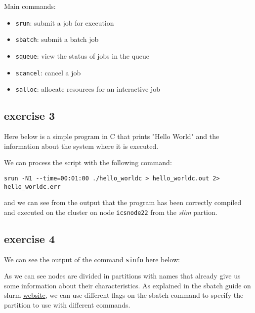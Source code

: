 Main commands:
\begin{itemize}
    \item \texttt{srun}: submit a job for execution
    \item \texttt{sbatch}: submit a batch job
    \item \texttt{squeue}: view the status of jobs in the queue
    \item \texttt{scancel}: cancel a job
    \item \texttt{salloc}: allocate resources for an interactive job
\end{itemize}

\subsection{exercise 3}
Here below is a simple program in C that prints "Hello World" and the information about the system where it is executed.


We can process the script with the following command:    
\begin{verbatim}
srun -N1 --time=00:01:00 ./hello_worldc > hello_worldc.out 2> hello_worldc.err
\end{verbatim}
and we can see from the output that the program has been correctly compiled and executed on the cluster on node \texttt{icsnode22} from the \textit{slim} partion.



\subsection{exercise 4}
We can see the output of the command \texttt{sinfo} here below: 



As we can see nodes are divided in partitions with names that already give us some information about their characteristics.
As explained in the sbatch guide on slurm \href{https://slurm.schedmd.com/sbatch.html}{website}, we can use different flags on the sbatch command to specify the partition to use with different commands.


